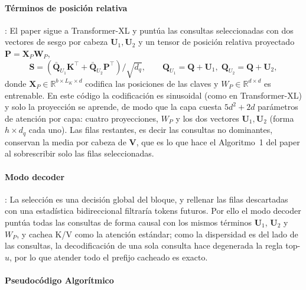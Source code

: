 \paragraph{Términos de posición relativa}: El paper sigue a Transformer-XL y puntúa las consultas seleccionadas con dos vectores de sesgo por cabeza $\mathbf{U}_1,\mathbf{U}_2$ y un tensor de posición relativa proyectado $\mathbf{P}=\mathbf{X}_P\mathbf{W}_P$,
\begin{equation}
\mathbf{S} = \left(\bar{\mathbf{Q}}_{U_1}\mathbf{K}^{\top} + \bar{\mathbf{Q}}_{U_2}\mathbf{P}^{\top}\right)/\sqrt{d_q},
\qquad
\mathbf{Q}_{U_1} = \mathbf{Q}+\mathbf{U}_1,\;
\mathbf{Q}_{U_2} = \mathbf{Q}+\mathbf{U}_2,
\end{equation}
donde $\mathbf{X}_P\in\mathbb{R}^{b\times L_K\times d}$ codifica las posiciones de las claves y $W_P\in\mathbb{R}^{d\times d}$ es entrenable. En este código la codificación es sinusoidal (como en Transformer-XL) y solo la proyección se aprende, de modo que la capa cuesta $5d^2+2d$ parámetros de atención por capa: cuatro proyecciones, $W_P$ y los dos vectores $\mathbf{U}_1,\mathbf{U}_2$ (forma $h\times d_q$ cada uno). Las filas restantes, es decir las consultas no dominantes, conservan la media por cabeza de $\mathbf{V}$, que es lo que hace el Algoritmo~1 del paper al sobrescribir solo las filas seleccionadas.

\paragraph{Modo decoder}: La selección es una decisión global del bloque, y rellenar las filas descartadas con una estadística bidireccional filtraría tokens futuros. Por ello el modo decoder puntúa todas las consultas de forma causal con los mismos términos $\mathbf{U}_1$, $\mathbf{U}_2$ y $W_P$, y cachea K/V como la atención estándar; como la dispersidad es del lado de las consultas, la decodificación de una sola consulta hace degenerada la regla top-$u$, por lo que atender todo el prefijo cacheado es exacto.

\paragraph{Pseudocódigo Algorítmico}

